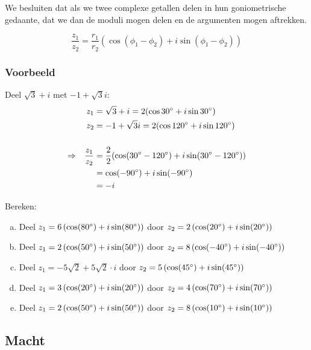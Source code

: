 \documentclass[12pt,twoside,a4paper]{article}
\begin{document}
We besluiten dat als we twee complexe getallen delen in hun goniometrische gedaante, dat we dan de moduli mogen delen en de argumenten mogen aftrekken.\\

\begin{mdframed}
  \[
    \dfrac{z_1}{z_2} = \dfrac{r_1}{r_2} \left(\cos (\phi_1 - \phi_2) + i \sin (\phi_1 - \phi_2)\right)
  \]
\end{mdframed}

\subsubsection*{Voorbeeld}

Deel $\sqrt{3} + i$ met $-1+\sqrt{3}i$:
  \begin{align*}
      &&       z_1 &= \sqrt{3} + i = 2(\cos 30^\circ + i\sin 30^\circ)\\
      &&       z_2 &= -1 + \sqrt{3}i = 2(\cos 120^\circ + i\sin 120^\circ)\\\\
    \Rightarrow && \dfrac{z_1}{z_2} &= \dfrac{2}{2} ( \cos( 30^\circ - 120^\circ ) + i\sin( 30^\circ - 120^\circ ) )\\
      &&           &= \cos(-90^\circ) + i\sin(-90^\circ)\\
      &&           &= -i
  \end{align*}

\begin{oefening}
Bereken:
\begin{enumerate}[(a)]
  \itemsep.5em
  \item Deel $z_1=6\left(\cos(80^\circ)+i\sin(80^\circ)\right)$ door $z_2=2\left(\cos(20^\circ)+i\sin(20^\circ)\right)$
  \item Deel $z_1=2\left(\cos(50^\circ)+i\sin(50^\circ)\right)$ door $z_2=8\left(\cos(-40^\circ)+i\sin(-40^\circ)\right)$
  \item Deel $z_1=-5\sqrt{2}+5\sqrt{2} \cdot i$ door $z_2=5\left(\cos(45^\circ)+i\sin(45^\circ)\right)$
  \item Deel $z_1=3\left(\cos(20^\circ)+i\sin(20^\circ)\right)$ door $z_2=4\left(\cos(70^\circ)+i\sin(70^\circ)\right)$
  \item Deel $z_1=2\left(\cos(50^\circ)+i\sin(50^\circ)\right)$ door $z_2=8\left(\cos(10^\circ)+i\sin(10^\circ)\right)$
\end{enumerate}
\end{oefening}

\subsection{Macht}
\end{document}
